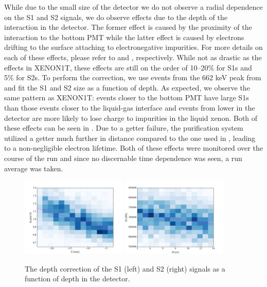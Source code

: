 While due to the small size of the detector we do not observe a radial dependence on the S1 and S2 signals, we do observe effects due to the depth of the interaction in the detector.  The former effect is caused by the proximity of the interaction to the bottom PMT while the latter effect is caused by electrons drifting to the surface attaching to electronegative impurities.  For more details on each of these effects, please refer to  and , respectively.  While not as drastic as the effects in XENON1T, these effects are still on the order of 10--20\% for S1s and 5\% for S2s.  To perform the correction, we use events from the 662 keV peak from \cesium{} and fit the S1 and S2 size as a function of depth.  As expected, we observe the same pattern as XENON1T: events closer to the bottom PMT have large S1s than those events closer to the liquid-gas interface and events from lower in the detector are more likely to lose charge to impurities in the liquid xenon.  Both of these effects can be seen in .  Due to a getter failure, the purification system utilized a getter much further in distance compared to the one used in , leading to a non-negligible electron lifetime.  Both of these effects were monitored over the course of the run and since no discernable time dependence was seen, a run average was taken.


\begin{figure}[t]
        \centering
	\includegraphics[width=0.45\textwidth]{nerix_s1_z_correction}
	\includegraphics[width=0.45\textwidth]{nerix_s2_dt_correction}
	\caption{The depth correction of the S1 (left) and S2 (right) signals as a function of depth in the detector.}
	\label{fig:nerix_pos_correction}
\end{figure}




